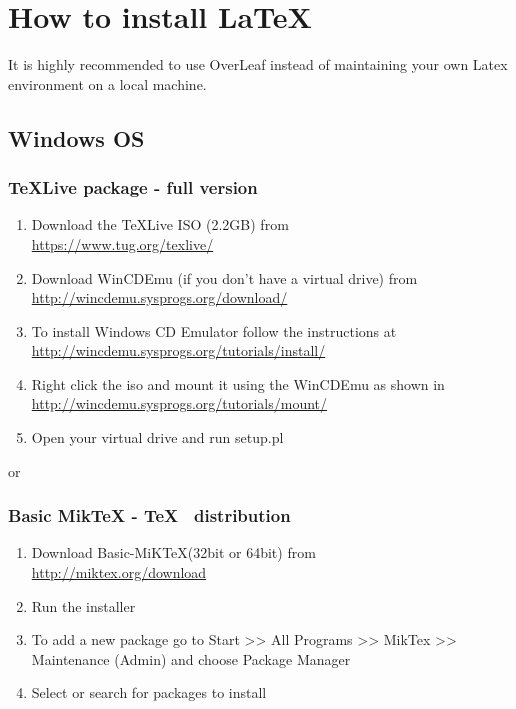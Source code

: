 \chapter{How to install \LaTeX} 

It is highly recommended to use OverLeaf instead of maintaining your own Latex environment on a local machine.

\section*{Windows OS}

\subsection*{TeXLive package - full version}
\begin{enumerate}
\item	Download the TeXLive ISO (2.2GB) from\\
\href{https://www.tug.org/texlive/}{https://www.tug.org/texlive/}
\item	Download WinCDEmu (if you don't have a virtual drive) from \\
\href{http://wincdemu.sysprogs.org/download/}
{http://wincdemu.sysprogs.org/download/}
\item	To install Windows CD Emulator follow the instructions at\\
\href{http://wincdemu.sysprogs.org/tutorials/install/}
{http://wincdemu.sysprogs.org/tutorials/install/}
\item	Right click the iso and mount it using the WinCDEmu as shown in \\
\href{http://wincdemu.sysprogs.org/tutorials/mount/}{
http://wincdemu.sysprogs.org/tutorials/mount/}
\item	Open your virtual drive and run setup.pl
\end{enumerate}

or

\subsection*{Basic MikTeX - \TeX~ distribution}
\begin{enumerate}
\item	Download Basic-MiK\TeX (32bit or 64bit) from\\
\href{http://miktex.org/download}{http://miktex.org/download}
\item	Run the installer 
\item	To add a new package go to Start >> All Programs >> MikTex >> Maintenance (Admin) and choose Package Manager
\item	Select or search for packages to install
\end{enumerate}

